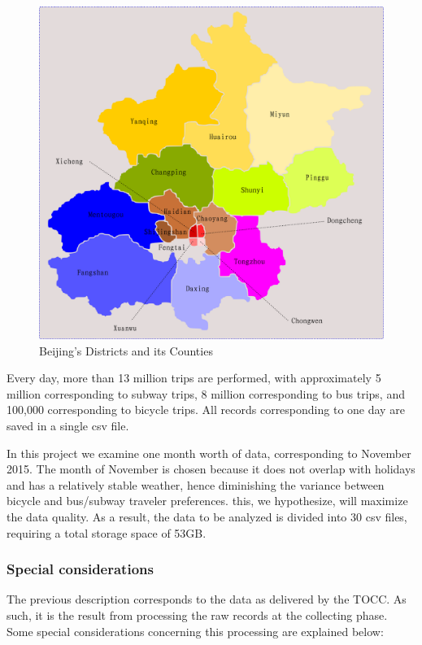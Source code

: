 \documentclass{article}
\begin{document}
\begin{figure}
  \centering
  \includegraphics[width=.8\linewidth]{./images/beijing_18areas.png}
  \caption{Beijing's Districts and its Counties}
  \label{fig:data/18areas}
\end{figure}

Every day, more than 13 million trips are performed, with approximately 5 million corresponding to subway trips, 8 million corresponding to bus trips, and 100,000 corresponding to bicycle trips. All records corresponding to one day are saved in a single csv file. 

In this project we examine one month worth of data, corresponding to November 2015. The month of November is chosen because it does not overlap with holidays and has a relatively stable weather, hence diminishing the variance between bicycle and bus/subway traveler preferences. this, we hypothesize, will maximize the data quality. As a result, the data to be analyzed is divided into 30 csv files, requiring a total storage space of 53GB.

\subsubsection{Special considerations}
The previous description corresponds to the data as delivered by the TOCC. As such, it is the result from processing the raw records at the collecting phase. Some special considerations concerning this processing are explained below:
\end{document}
